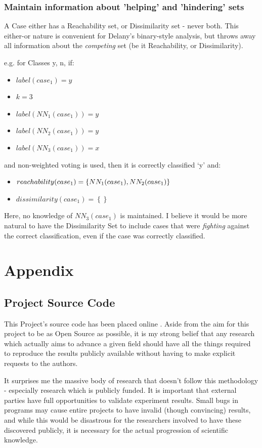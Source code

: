 \documentclass[a4paper,11pt]{report}
\begin{document}
\subsection{Maintain information about 'helping' and 'hindering' sets}
A Case either has a Reachability set, or Dissimilarity set - never both. This either-or nature is convenient for Delany's binary-style analysis, but throws away all information about the \emph{competing} set (be it Reachability, or Dissimilarity).

e.g. for Classes {y, n}, if:
\begin{itemize}
	\item $label(case_{1})=y$ 
	\item $k = 3$
	\item $label(NN_{1}(case_{1})) = y$ 
	\item $label(NN_{2}(case_{1})) = y$
	\item $label(NN_{3}(case_{1})) = x$  
\end{itemize}
and non-weighted voting is used, then it is correctly classified `y' and:
\begin{itemize}
	\item $reachability(case_{1})=\left\{ NN_{1}(case_{1}),\hphantom{}NN_{2}(case_{1})\right\} $
	\item $dissimilarity(case_{1})=\left\{ \right\} $
\end{itemize}

Here, no knowledge of $NN_{3}(case_{1})$ is maintained. I believe it would be more natural to have the Dissimilarity Set to include cases that were \emph{fighting} against the correct classification, even if the case was correctly classified.

\chapter{Appendix}
\section{Project Source Code}
This Project's source code has been placed online \citep{web:projectsourcecode}. Aside from the aim for this project to be as Open Source as possible, it is my strong belief that any research which actually aims to advance a given field should have all the things required to reproduce the results publicly available without having to make explicit requests to the authors. 

It surprises me the massive body of research that doesn't follow this methodology - especially research which is publicly funded. It is important that external parties have full opportunities to validate experiment results. Small bugs in programs may cause entire projects to have invalid (though convincing) results, and while this would be disastrous for the researchers involved to have these discovered publicly, it is necessary for the actual progression of scientific knowledge.
\end{document}
